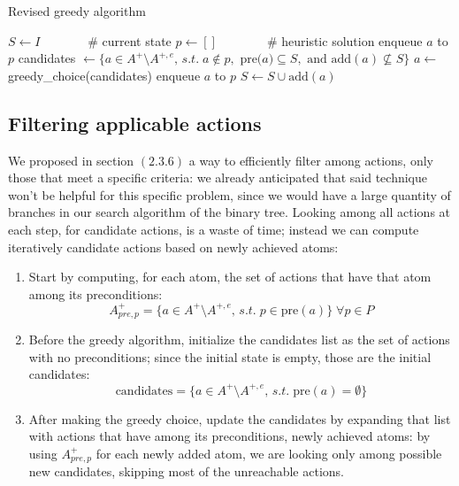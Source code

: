 \begin{algorithm}[h]
    \caption{Revised greedy algorithm}
    \begin{algorithmic}
        \State $S\gets I\qquad\quad\;\;\;$\# current state
        \State $p\gets []\qquad\qquad$\# heuristic solution
                \State enqueue $a$ to $p$
            \Else
                \State candidates $\gets\{a\in A^+\setminus A^{+,e},\,s.t.\;a\not\in p,\mbox{ pre(}a)\subseteq S,\mbox{ and add}(a)\not\subseteq S\}$
                \State $a\gets$ greedy\_choice(candidates)
                \State enqueue $a$ to $p$
            \EndIf
            \State $S\gets S\cup\mbox{add}(a)$
        \EndWhile
    \end{algorithmic}
\end{algorithm}

\subsection{Filtering applicable actions}

We proposed in section $(2.3.6)$ a way to efficiently filter among actions, only those that meet a specific criteria: we already anticipated that said technique won't be helpful for this specific problem, since we would have a large quantity of branches in our search algorithm of the binary tree. Looking among all actions at each step, for candidate actions, is a waste of time; instead we can compute iteratively candidate actions based on newly achieved atoms:
\begin{enumerate}
    \item Start by computing, for each atom, the set of actions that have that atom among its preconditions: $$A^+_{pre,p}=\{a\in A^+\setminus A^{+,e},\,s.t.\;p\in\mbox{pre}(a)\}\;\forall p\in P$$
    \item Before the greedy algorithm, initialize the candidates list as the set of actions with no preconditions; since the initial state is empty, those are the initial candidates:
    $$\mbox{candidates}=\{a\in A^+\setminus A^{+,e},\,s.t.\;\mbox{pre}(a)=\emptyset\}$$
    \item After making the greedy choice, update the candidates by expanding that list with actions that have among its preconditions, newly achieved atoms: by using $A^+_{pre,p}$ for each newly added atom, we are looking only among possible new candidates, skipping most of the unreachable actions.
\end{enumerate}

